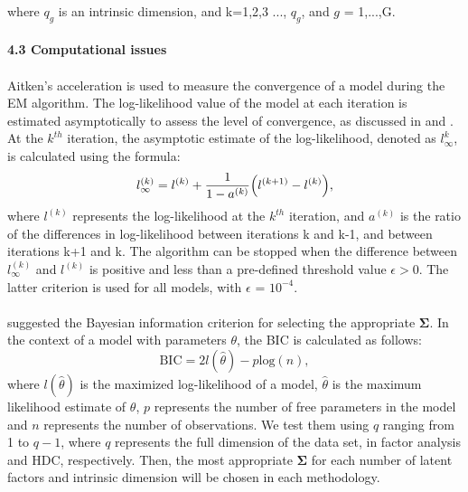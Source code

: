 \documentclass[11pt]{article}
\begin{document}
where $q_g$ is an intrinsic dimension, and k=1,2,3 ..., $q_g$, and $g$ = 1,...,G.\\
\\
\textbf{4.3 Computational issues}\\
\\
Aitken's acceleration is used to measure the convergence of a model during the EM algorithm. The log-likelihood value of the model at each iteration is estimated asymptotically to assess the level of convergence, as discussed in  \cite{kim2019subspace} and \cite{mcnicholas2008parsimonious}. At the $k^{th}$ iteration, the asymptotic estimate of the log-likelihood, denoted as $l_\infty^{k}$, is calculated using the formula: 
$$l_{\infty}^{(k)} = l^{(k)}+\frac{1}{1-a^{(k)}}\Bigl(l^{(k+1)}-l^{(k)}\Bigr),$$
where $l^{(k)}$ represents the log-likelihood at the $k^{th}$ iteration, and $a^{(k)}$ is the ratio of the differences in log-likelihood between iterations k and k-1, and between iterations k+1 and k. The algorithm can be stopped when the difference between $l_\infty^{(k)}$ and $l^{(k)}$ is positive and less than a pre-defined threshold value $\epsilon>0$. The latter criterion is used for all models, with $\epsilon$ = $10^{-4}$.\\
\\
\cite{mcnicholas2008parsimonious} suggested the Bayesian information criterion \citep{schwarz1978estimating} for selecting the appropriate $\boldsymbol{\Sigma}$. In the context of a model with parameters $\theta$, the BIC is calculated as follows:
$$ \text{BIC} = 2l(\hat{\theta})-p\text{log}(n),$$
where $l(\hat{\theta})$ is the maximized log-likelihood of a model, $\hat{\theta}$ is the maximum likelihood estimate of $\theta$, $p$ represents the number of free parameters in the model and $n$ represents the number of observations. We test them using $q$ ranging from 1 to $q-1$, where $q$ represents the full dimension of the data set, in factor analysis and HDC, respectively. Then, the most appropriate $\boldsymbol{\Sigma}$ for each number of latent factors and intrinsic dimension will be chosen in each methodology. 
\end{document}
